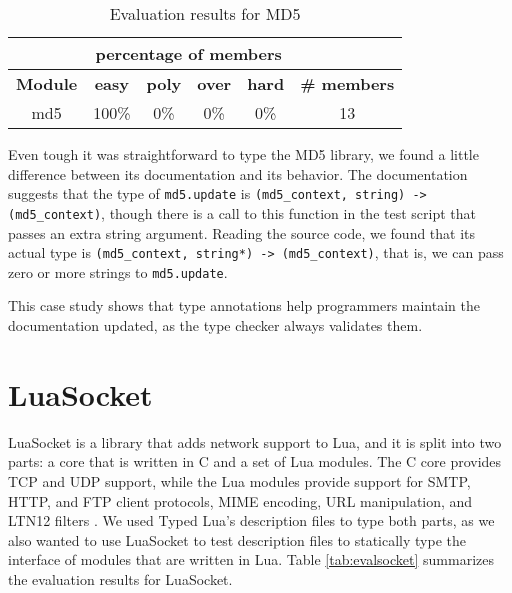 \begin{table}[!ht]
\begin{center}
\begin{tabular}{|c|c|c|c|c|c|}
\cline{2-5}
\multicolumn{1}{c}{} & \multicolumn{4}{|c|}{percentage of members} & \multicolumn{1}{c}{} \\
\hline
\textbf{Module} & \textbf{easy} & \textbf{poly} & \textbf{over} & \textbf{hard} & \textbf{\# members} \\
\hline
md5 & 100\% & 0\% & 0\% & 0\% & 13 \\ %
\hline
\end{tabular}
\end{center}
\caption{Evaluation results for MD5}
\label{tab:evalmd5}
\end{table}

Even tough it was straightforward to type the MD5 library,
we found a little difference between its documentation and its behavior.
The documentation suggests that the type of \texttt{md5.update}
is \texttt{(md5\string_context, string) -> (md5\string_context)},
though there is a call to this function in the test script that passes
an extra string argument.
Reading the source code, we found that its actual type is
\texttt{(md5\string_context, string*) -> (md5\string_context)},
that is, we can pass zero or more strings to \texttt{md5.update}.

This case study shows that type annotations help programmers maintain the
documentation updated, as the type checker always validates them.

\section{LuaSocket}

LuaSocket is a library that adds network support to Lua,
and it is split into two parts: a core that is written in C and a set of
Lua modules.
The C core provides TCP and UDP support, while the Lua modules provide
support for SMTP, HTTP, and FTP client protocols, MIME encoding,
URL manipulation, and LTN12 filters \cite{nehab2008ltn012}.
We used Typed Lua's description files to type both parts, as we also
wanted to use LuaSocket to test description files to statically type
the interface of modules that are written in Lua.
Table \ref{tab:evalsocket} summarizes the evaluation results for LuaSocket.

